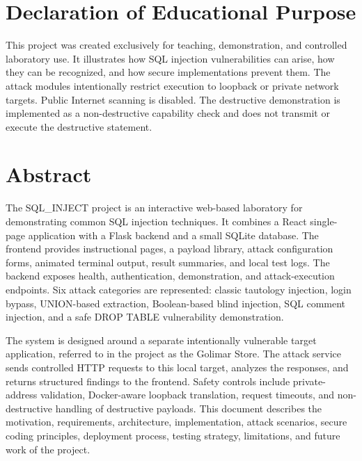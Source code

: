 \documentclass[12pt,a4paper]{article}
\newcommand{\code}[1]{\texttt{\detokenize{#1}}}
\newcommand{\projectname}{SQL\_INJECT}
\begin{document}

\section*{Declaration of Educational Purpose}

This project was created exclusively for teaching, demonstration, and controlled laboratory use. It illustrates how SQL injection vulnerabilities can arise, how they can be recognized, and how secure implementations prevent them. The attack modules intentionally restrict execution to loopback or private network targets. Public Internet scanning is disabled. The destructive \code{DROP TABLE} demonstration is implemented as a non-destructive capability check and does not transmit or execute the destructive statement.

\section*{Abstract}

The \projectname{} project is an interactive web-based laboratory for demonstrating common SQL injection techniques. It combines a React single-page application with a Flask backend and a small SQLite database. The frontend provides instructional pages, a payload library, attack configuration forms, animated terminal output, result summaries, and local test logs. The backend exposes health, authentication, demonstration, and attack-execution endpoints. Six attack categories are represented: classic tautology injection, login bypass, UNION-based extraction, Boolean-based blind injection, SQL comment injection, and a safe DROP TABLE vulnerability demonstration.

The system is designed around a separate intentionally vulnerable target application, referred to in the project as the Golimar Store. The attack service sends controlled HTTP requests to this local target, analyzes the responses, and returns structured findings to the frontend. Safety controls include private-address validation, Docker-aware loopback translation, request timeouts, and non-destructive handling of destructive payloads. This document describes the motivation, requirements, architecture, implementation, attack scenarios, secure coding principles, deployment process, testing strategy, limitations, and future work of the project.
\end{document}
